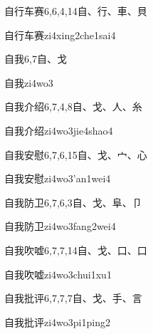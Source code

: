\begin{entry}{自行车赛}{6,6,4,14}{⾃、⾏、⾞、⾙}
  \begin{phonetics}{自行车赛}{zi4xing2che1sai4}
  \end{phonetics}
\end{entry}

\begin{entry}{自我}{6,7}{⾃、⼽}
  \begin{phonetics}{自我}{zi4wo3}
  \end{phonetics}
\end{entry}

\begin{entry}{自我介绍}{6,7,4,8}{⾃、⼽、⼈、⽷}
  \begin{phonetics}{自我介绍}{zi4wo3jie4shao4}
  \end{phonetics}
\end{entry}

\begin{entry}{自我安慰}{6,7,6,15}{⾃、⼽、⼧、⼼}
  \begin{phonetics}{自我安慰}{zi4wo3'an1wei4}
  \end{phonetics}
\end{entry}

\begin{entry}{自我防卫}{6,7,6,3}{⾃、⼽、⾩、⼙}
  \begin{phonetics}{自我防卫}{zi4wo3fang2wei4}
  \end{phonetics}
\end{entry}

\begin{entry}{自我吹嘘}{6,7,7,14}{⾃、⼽、⼝、⼝}
  \begin{phonetics}{自我吹嘘}{zi4wo3chui1xu1}
  \end{phonetics}
\end{entry}

\begin{entry}{自我批评}{6,7,7,7}{⾃、⼽、⼿、⾔}
  \begin{phonetics}{自我批评}{zi4wo3pi1ping2}
  \end{phonetics}
\end{entry}

